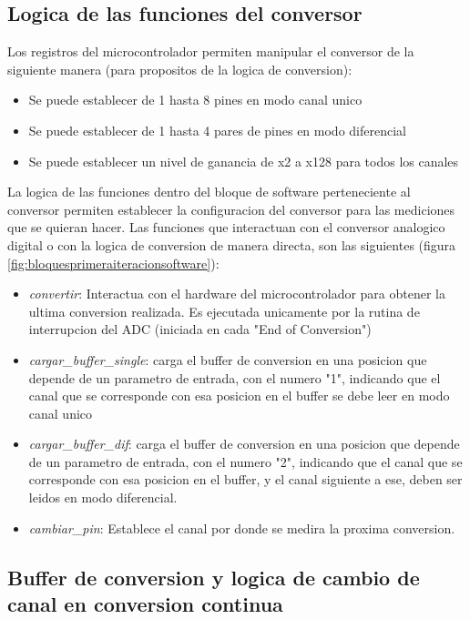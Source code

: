 \subsection{Logica de las funciones del conversor} %
\label{it2:sub:logica_de_las_funciones_del_conversor}

Los registros del microcontrolador permiten manipular el conversor de la siguiente manera (para propositos de la logica de conversion):

\begin{itemize}
  \item Se puede establecer de 1 hasta 8 pines en modo canal unico
  \item Se puede establecer de 1 hasta 4 pares de pines en modo diferencial
  \item Se puede establecer un nivel de ganancia de x2 a x128 para todos los canales
\end{itemize}

La logica de las funciones dentro del bloque de software perteneciente al conversor permiten establecer la configuracion del conversor para las mediciones que se quieran hacer. Las funciones que interactuan con el conversor analogico digital o con la logica de conversion de manera directa, son las siguientes (figura \ref{fig:bloquesprimeraiteracionsoftware}):

\begin{itemize}
  \item \textit{convertir}: Interactua con el hardware del microcontrolador para obtener la ultima conversion realizada. Es ejecutada unicamente por la rutina de interrupcion del ADC (iniciada en cada "End of Conversion")
  \item \textit{cargar\_buffer\_single}: carga el buffer de conversion en una posicion que depende de un parametro de entrada, con el numero "1", indicando que el canal que se corresponde con esa posicion en el buffer se debe leer en modo canal unico
  \item \textit{cargar\_buffer\_dif}: carga el buffer de conversion en una posicion que depende de un parametro de entrada, con el numero "2", indicando que el canal que se corresponde con esa posicion en el buffer, y el canal siguiente a ese, deben ser leidos en modo diferencial.
  \item \textit{cambiar\_pin}: Establece el canal por donde se medira la proxima conversion.
\end{itemize}

\subsection{Buffer de conversion y logica de cambio de canal en conversion continua} %
\label{it2:sub:buffer_de_conversion_y_logica_de_cambio_de_canal_en_conversion_continua}

